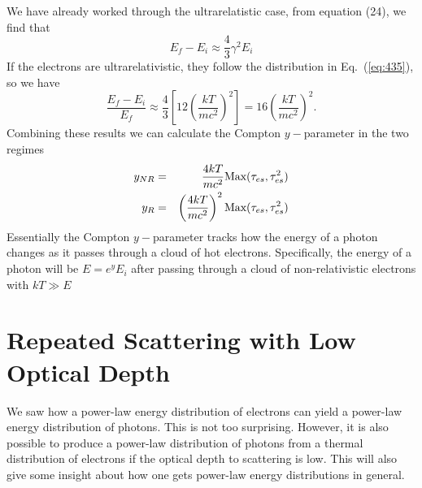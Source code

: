 We have already worked through the ultrarelatistic case, from equation
(24), we find that
\begin{equation}
E_f - E_i \approx \frac{4}{3} \gamma^2 E_i
\label{eq:438}
\end{equation}
If the electrons are ultrarelativistic, they follow the distribution
in Eq.~(\ref{eq:435}), so we have
\begin{equation}
\frac{E_f - E_i}{E_f} \approx \frac{4}{3} \left [ 12 \left (
  \frac{kT}{mc^2} \right )^2 \right ] = 16  \left (
  \frac{kT}{mc^2} \right )^2.
\label{eq:439}
\end{equation}
Combining these results we can calculate the Compton $y-$parameter in
the two regimes
\begin{eqnarray}
y_{NR} &=& \frac{4kT}{mc^2} \hbox{\rm Max} (\tau_{es},\tau_{es}^2) \\
y_{R} &=& \left ( \frac{4kT}{mc^2} \right )^2 \hbox{\rm Max} (\tau_{es},\tau_{es}^2) 
\label{eq:440}
\end{eqnarray}
Essentially the Compton $y-$parameter tracks how the energy of a
photon changes as it passes through a cloud of hot electrons.
Specifically, the energy of a photon will be $E=e^y E_i$ after passing
through a cloud of non-relativistic electrons with $kT \gg E$

\section{Repeated Scattering with Low Optical Depth}
\label{sec:repe-scatt-with}

We saw how a power-law energy distribution of electrons can yield a
power-law energy distribution of photons.  This is not too
surprising.  However, it is also possible to produce a power-law
distribution of photons from a thermal distribution of electrons if
the optical depth to scattering is low.  This will also give some
insight about how one gets power-law energy distributions in general.

